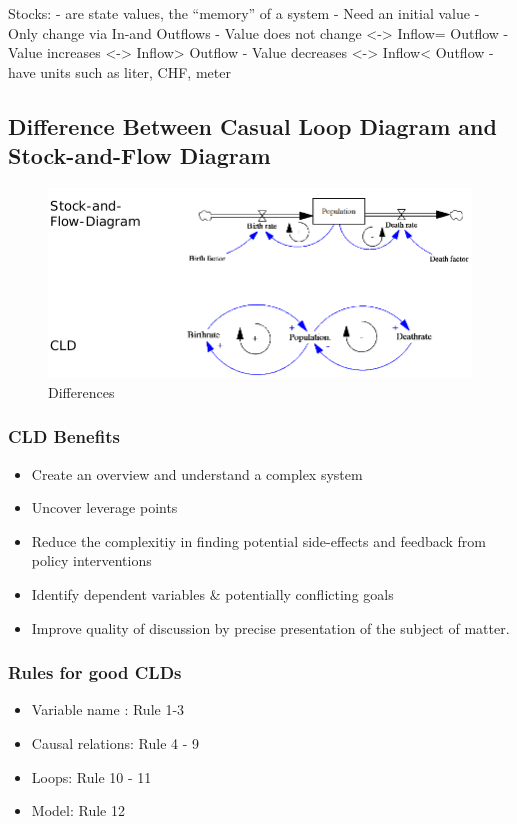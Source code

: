 Stocks: - are state values, the ``memory'' of a system - Need an initial
value - Only change via In-and Outflows - Value does not change <->
Inflow= Outflow - Value increases <-> Inflow\textgreater{} Outflow - Value
decreases <-> Inflow\textless{} Outflow - have units such as liter, CHF,
meter

\hypertarget{difference-between-casual-loop-diagram-and-stock-and-flow-diagram}{%
\subsection{Difference Between Casual Loop Diagram and Stock-and-Flow
Diagram}\label{difference-between-casual-loop-diagram-and-stock-and-flow-diagram}}

\begin{figure}
\centering
\includegraphics{figures/cldVsStockFlow.png}
\caption{Differences}
\end{figure}

\hypertarget{cld-benefits}{%
\subsubsection{CLD Benefits}\label{cld-benefits}}

\begin{itemize}
\tightlist
\item
  Create an overview and understand a complex system
\item
  Uncover leverage points
\item
  Reduce the complexitiy in finding potential side-effects and feedback
  from policy interventions
\item
  Identify dependent variables \& potentially conflicting goals
\item
  Improve quality of discussion by precise presentation of the subject
  of matter.
\end{itemize}

\hypertarget{rules-for-good-clds}{%
\subsubsection{Rules for good CLDs}\label{rules-for-good-clds}}

\begin{itemize}
\tightlist
\item
  Variable name : Rule 1-3
\item
  Causal relations: Rule 4 - 9
\item
  Loops: Rule 10 - 11
\item
  Model: Rule 12
\end{itemize}
